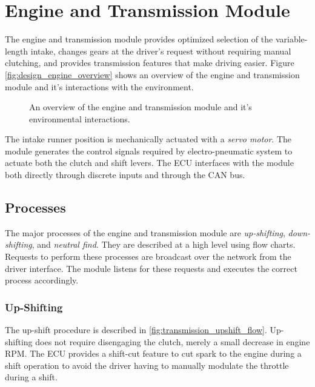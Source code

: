 \section{Engine and Transmission Module\label{sec:engine_transmission_design}}

The engine and transmission module provides optimized selection of the variable-length intake, changes gears at the driver's request without requiring manual clutching, and provides transmission features that make driving easier. Figure \ref{fig:design_engine_overview} shows an overview of the engine and transmission module and it's interactions with the environment.

\begin{figure}[H]
	\centering
	
	\caption{An overview of the engine and transmission module and it's environmental interactions.}
	\label{fig:design_engine_overview_block}
\end{figure}

The intake runner position is mechanically actuated with a \emph{servo motor}. The module generates the control signals required by electro-pneumatic system to actuate both the clutch and shift levers. The ECU interfaces with the module both directly through discrete inputs and through the CAN bus.

\subsection{Processes}

The major processes of the engine and transmission module are \emph{up-shifting}, \emph{down-shifting}, and \emph{neutral find}. They are described at a high level using flow charts. Requests to perform these processes are broadcast over the network from the driver interface. The module listens for these requests and executes the correct process accordingly.

\subsubsection{Up-Shifting}

The up-shift procedure is described in \ref{fig:transmission_upshift_flow}. Up-shifting does not require disengaging the clutch, merely a small decrease in engine RPM. The ECU provides a shift-cut feature to cut spark to the engine during a shift operation to avoid the driver having to manually modulate the throttle during a shift.

